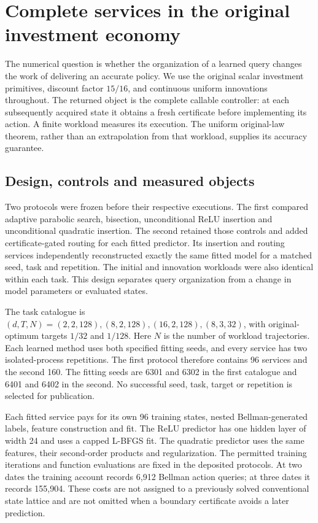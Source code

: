 \section{Complete services in the original investment economy}\label{sec:study65}
The numerical question is whether the organization of a learned query changes the work of delivering an accurate policy. We use the original scalar investment primitives, discount factor $15/16$, and continuous uniform innovations throughout. The returned object is the complete callable controller: at each subsequently acquired state it obtains a fresh certificate before implementing its action. A finite workload measures its execution. The uniform original-law theorem, rather than an extrapolation from that workload, supplies its accuracy guarantee.

\subsection{Design, controls and measured objects}
Two protocols were frozen before their respective executions. The first compared adaptive parabolic search, bisection, unconditional ReLU insertion and unconditional quadratic insertion. The second retained those controls and added certificate-gated routing for each fitted predictor. Its insertion and routing services independently reconstructed exactly the same fitted model for a matched seed, task and repetition. The initial and innovation workloads were also identical within each task. This design separates query organization from a change in model parameters or evaluated states.

The task catalogue is $(d,T,N)=(2,2,128),(8,2,128),(16,2,128),(8,3,32)$, with original-optimum targets $1/32$ and $1/128$. Here $N$ is the number of workload trajectories. Each learned method uses both specified fitting seeds, and every service has two isolated-process repetitions. The first protocol therefore contains 96 services and the second 160. The fitting seeds are 6301 and 6302 in the first catalogue and 6401 and 6402 in the second. No successful seed, task, target or repetition is selected for publication.

Each fitted service pays for its own 96 training states, nested Bellman-generated labels, feature construction and fit. The ReLU predictor has one hidden layer of width 24 and uses a capped L-BFGS fit. The quadratic predictor uses the same features, their second-order products and regularization. The permitted training iterations and function evaluations are fixed in the deposited protocols. At two dates the training account records 6,912 Bellman action queries; at three dates it records 155,904. These costs are not assigned to a previously solved conventional state lattice and are not omitted when a boundary certificate avoids a later prediction.

